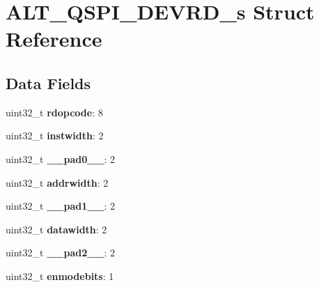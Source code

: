 \hypertarget{structALT__QSPI__DEVRD__s}{}\section{A\+L\+T\+\_\+\+Q\+S\+P\+I\+\_\+\+D\+E\+V\+R\+D\+\_\+s Struct Reference}
\label{structALT__QSPI__DEVRD__s}
\subsection*{Data Fields}
\begin{DoxyCompactItemize}
\item 
\mbox{\label{structALT__QSPI__DEVRD__s_a5311d83d0c5330ed73bd077716d8e9c4}} 
uint32\+\_\+t {\bfseries rdopcode}\+: 8
\item 
\mbox{\label{structALT__QSPI__DEVRD__s_a6e16f4b278a87b335049ff27457e951c}} 
uint32\+\_\+t {\bfseries instwidth}\+: 2
\item 
\mbox{\label{structALT__QSPI__DEVRD__s_a4ff2dfff8fdb616ec4c5f1a766bdc301}} 
uint32\+\_\+t {\bfseries \+\_\+\+\_\+pad0\+\_\+\+\_\+}\+: 2
\item 
\mbox{\label{structALT__QSPI__DEVRD__s_a3cce04067b8b3b5d0c812b5eedb0ba55}} 
uint32\+\_\+t {\bfseries addrwidth}\+: 2
\item 
\mbox{\label{structALT__QSPI__DEVRD__s_ad661d0df0648e2a15b2159a9bae5cf0c}} 
uint32\+\_\+t {\bfseries \+\_\+\+\_\+pad1\+\_\+\+\_\+}\+: 2
\item 
\mbox{\label{structALT__QSPI__DEVRD__s_a2a214ab959bdedc9f445811159bd092d}} 
uint32\+\_\+t {\bfseries datawidth}\+: 2
\item 
\mbox{\label{structALT__QSPI__DEVRD__s_ae14eabc878f7e7fb60477d6e2b51175a}} 
uint32\+\_\+t {\bfseries \+\_\+\+\_\+pad2\+\_\+\+\_\+}\+: 2
\item 
\mbox{\label{structALT__QSPI__DEVRD__s_a90c0ee3e80ac1b19621560e27b3d1c26}} 
uint32\+\_\+t {\bfseries enmodebits}\+: 1
\item 

\end{DoxyCompactItemize}
